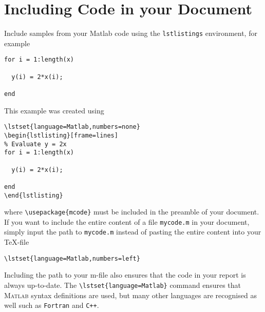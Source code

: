 \section{Including Code in your Document}
Include samples from your Matlab code using the \texttt{lstlistings} environment, for example
\lstset{language=Matlab,numbers=none}
\begin{lstlisting}[frame=lines]
% Evaluate y = 2x
for i = 1:length(x)

  y(i) = 2*x(i);

end
\end{lstlisting}
This example was created using
\begin{verbatim}
\lstset{language=Matlab,numbers=none}
\begin{lstlisting}[frame=lines]
% Evaluate y = 2x
for i = 1:length(x)

  y(i) = 2*x(i);

end
\end{lstlisting}
\end{verbatim}
where \texttt{\textbackslash usepackage\{mcode\}} must be included in the preamble of your document. If you want to include the entire content of a file \texttt{mycode.m} in your document, simply input the path to \texttt{mycode.m} instead of pasting the entire content into your \TeX -file
\begin{verbatim}
\lstset{language=Matlab,numbers=left}

\end{verbatim}
Including the path to your m-file also ensures that the code in your report is always up-to-date. The \texttt{\textbackslash lstset\{language=Matlab\}} command ensures that \textsc{Matlab} syntax definitions are used, but many other languages are recognised as well such as \texttt{Fortran} and \texttt{C++}.

